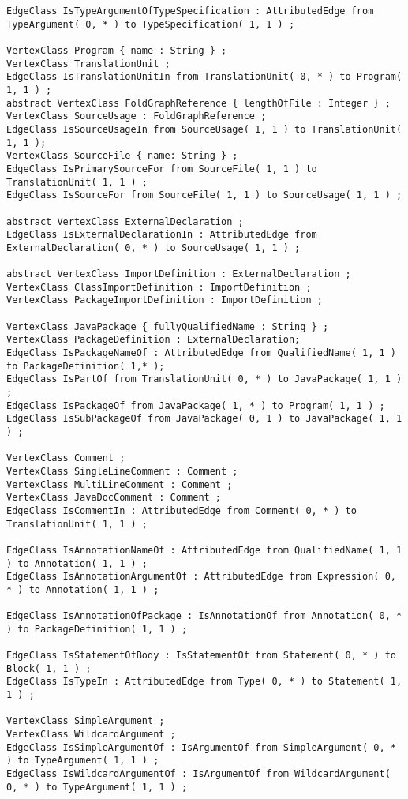 \begin{lstlisting}[caption=Das im Javaextraktor eingesetzte Schema, label=schema_complete, captionpos=b, style=tgschema]
EdgeClass IsTypeArgumentOfTypeSpecification : AttributedEdge from TypeArgument( 0, * ) to TypeSpecification( 1, 1 ) ;

VertexClass Program { name : String } ;
VertexClass TranslationUnit ;
EdgeClass IsTranslationUnitIn from TranslationUnit( 0, * ) to Program( 1, 1 ) ;
abstract VertexClass FoldGraphReference { lengthOfFile : Integer } ;
VertexClass SourceUsage : FoldGraphReference ;
EdgeClass IsSourceUsageIn from SourceUsage( 1, 1 ) to TranslationUnit( 1, 1 );
VertexClass SourceFile { name: String } ;
EdgeClass IsPrimarySourceFor from SourceFile( 1, 1 ) to TranslationUnit( 1, 1 ) ;
EdgeClass IsSourceFor from SourceFile( 1, 1 ) to SourceUsage( 1, 1 ) ;

abstract VertexClass ExternalDeclaration ;
EdgeClass IsExternalDeclarationIn : AttributedEdge from ExternalDeclaration( 0, * ) to SourceUsage( 1, 1 ) ;

abstract VertexClass ImportDefinition : ExternalDeclaration ;
VertexClass ClassImportDefinition : ImportDefinition ;
VertexClass PackageImportDefinition : ImportDefinition ;

VertexClass JavaPackage { fullyQualifiedName : String } ;
VertexClass PackageDefinition : ExternalDeclaration;
EdgeClass IsPackageNameOf : AttributedEdge from QualifiedName( 1, 1 ) to PackageDefinition( 1,* );
EdgeClass IsPartOf from TranslationUnit( 0, * ) to JavaPackage( 1, 1 ) ;
EdgeClass IsPackageOf from JavaPackage( 1, * ) to Program( 1, 1 ) ;
EdgeClass IsSubPackageOf from JavaPackage( 0, 1 ) to JavaPackage( 1, 1 ) ;

VertexClass Comment ;
VertexClass SingleLineComment : Comment ;
VertexClass MultiLineComment : Comment ;
VertexClass JavaDocComment : Comment ;
EdgeClass IsCommentIn : AttributedEdge from Comment( 0, * ) to TranslationUnit( 1, 1 ) ;

EdgeClass IsAnnotationNameOf : AttributedEdge from QualifiedName( 1, 1 ) to Annotation( 1, 1 ) ;
EdgeClass IsAnnotationArgumentOf : AttributedEdge from Expression( 0, * ) to Annotation( 1, 1 ) ;

EdgeClass IsAnnotationOfPackage : IsAnnotationOf from Annotation( 0, * ) to PackageDefinition( 1, 1 ) ;

EdgeClass IsStatementOfBody : IsStatementOf from Statement( 0, * ) to Block( 1, 1 ) ;
EdgeClass IsTypeIn : AttributedEdge from Type( 0, * ) to Statement( 1, 1 ) ;

VertexClass SimpleArgument ;
VertexClass WildcardArgument ;
EdgeClass IsSimpleArgumentOf : IsArgumentOf from SimpleArgument( 0, * ) to TypeArgument( 1, 1 ) ;
EdgeClass IsWildcardArgumentOf : IsArgumentOf from WildcardArgument( 0, * ) to TypeArgument( 1, 1 ) ;


\end{lstlisting}
